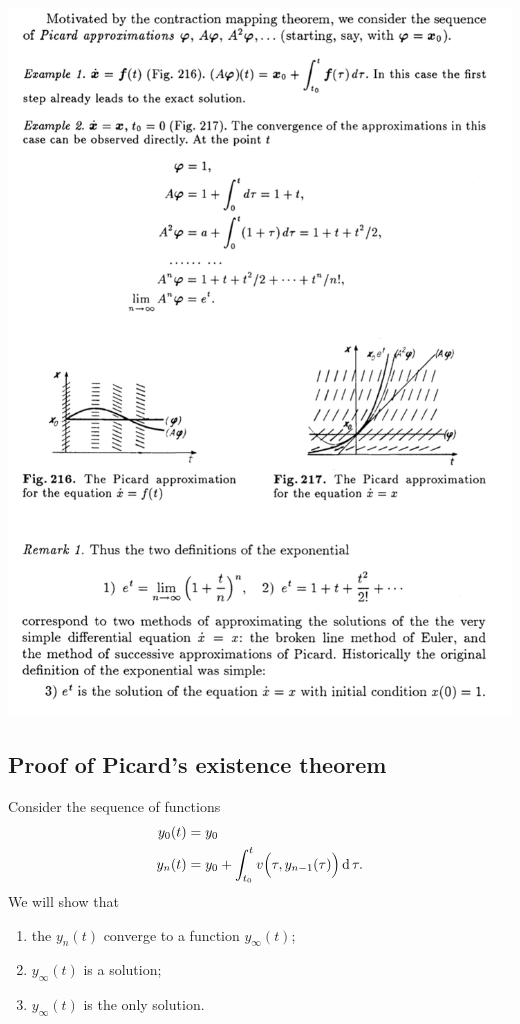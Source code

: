 \begin{mdframed}
\includegraphics[width=400pt]{img/differential-equations-picard-contraction-mapping-fixed-point-arnold-2.png}
\end{mdframed}


\newpage
\subsection{Proof of Picard's existence theorem}

Consider the sequence of functions
\begin{align*}
  y_0(t) &= y_0\\
  y_n(t) &= y_0 + \int_{t_0}^t v\Big(\tau, y_{n-1}(\tau)\Big) \operatorname{\text{d}}\tau.\\
\end{align*}
We will show that
\begin{enumerate}
\item the $y_n(t)$ converge to a function $y_\infty(t)$;
\item $y_\infty(t)$ is a solution;
\item $y_\infty(t)$ is the only solution.
\end{enumerate}

